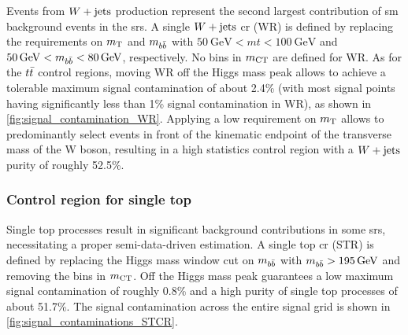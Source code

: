 Events from $W+\mathrm{jets}$ production represent the second largest contribution of \gls{sm} background events in the \glspl{sr}. A single $W+\mathrm{jets}$ \gls{cr} (WR) is defined by replacing the requirements on $m_{\textrm{T}}$ and $m_{b\bar{b}}$ with $\SI{50}{\GeV} < mt < \SI{100}{\GeV}$  and $\SI{50}{\GeV} < \mbb < \SI{80}{\GeV}$, respectively. No bins in $m_{\textrm{CT}}$ are defined for WR. As for the $t\bar{t}$ control regions, moving WR off the Higgs mass peak allows to achieve a tolerable maximum signal contamination of about 2.4\% (with most signal points having significantly less than 1\% signal contamination in WR), as shown in \cref{fig:signal_contamination_WR}. Applying a low requirement on $m_{\textrm{T}}$ allows to predominantly select events in front of the kinematic endpoint of the transverse mass of the W boson, resulting in a high statistics control region with a $W+\mathrm{jets}$ purity of roughly 52.5\%.

\subsubsection{Control region for single top}

Single top processes result in significant background contributions in some \glspl{sr}, necessitating a proper semi-data-driven estimation. A single top \gls{cr} (STR) is defined by replacing the Higgs mass window cut on $m_{b\bar{b}}$ with $\mbb > \SI{195}{\GeV}$ and removing the bins in $m_{\textrm{CT}}$. Off the Higgs mass peak guarantees a low maximum signal contamination of roughly 0.8\% and a high purity of single top processes of about 51.7\%. The signal contamination across the entire signal grid is shown in \cref{fig:signal_contaminations_STCR}.

